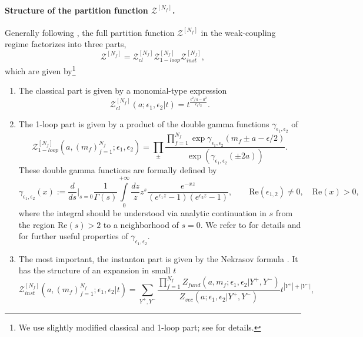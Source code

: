 \documentclass[12pt,a4paper]{article}
\numberwithin{equation}{section}
\begin{document}
\paragraph{Structure of the partition function $\mathcal{Z}^{[N_f]}$.} Generally following \cite{AGT09}, the full partition function $\mathcal{Z}^{[N_f]}$ in the weak-coupling regime factorizes into three parts, 
\begin{equation}\label{Zstr}
\mathcal{Z}^{[N_f]}=\mathcal{Z}_{cl}^{[N_f]}\mathcal{Z}_{1-loop}^{[N_f]}\mathcal{Z}_{inst}^{[N_f]},
\end{equation}
which are given by\footnote{We use slightly modified classical and 1-loop part; see \cite[Sec. 2.1]{BST25} for details.}
\begin{enumerate}
\item The classical part is given by a monomial-type expression
\begin{equation}\label{Zcl}
	\mathcal{Z}^{[N_f]}_{cl}(a;\epsilon_1,\epsilon_2|t)=t^{\frac{\epsilon^2/4-a^2}{\epsilon_1\epsilon_2}}.
\end{equation}
\item The 1-loop part is given by a product of the double gamma functions $\gamma_{\epsilon_1,\epsilon_2}$ of \cite{NY03L}
\begin{equation}
\label{Z1loop}
\mathcal{Z}^{[N_f]}_{1-loop}(a,(m_f)_{f=1}^{N_f};\epsilon_1,\epsilon_2)=\prod\limits_{\pm}\frac{\prod\limits_{f=1}^{N_f}\exp\gamma_{\epsilon_1,\epsilon_2}(m_f\pm a-\epsilon/2)}{\exp(\gamma_{\epsilon_1,\epsilon_2}(\pm 2a))}.
\end{equation}
These double gamma functions are formally defined by
\begin{equation} \label{gammaNYdef}
\gamma_{\epsilon_1,\epsilon_2}(x):=
   \frac{d}{ds}\Bigg|_{s=0}\frac1{\Gamma(s)}\int\limits_0^{+\infty}\frac{dz}{z} z^s \frac{e^{-xz}}{(e^{\epsilon_1z}-1)(e^{\epsilon_2z}-1)},\qquad \mathrm{Re}(\epsilon_{1,2})\neq0, \quad \mathrm{Re}(x)>0,
\end{equation}
where the integral should be understood via analytic continuation in $s$ from the region $\mathrm{Re}(s)>2$ to a neighborhood of $s=0$. We refer to \cite[App. B]{BST25} for details and for further useful properties of $\gamma_{\epsilon_1,\epsilon_2}$.
\item The most important, the instanton part is given by the Nekrasov formula \cite{N02,Flume:2002az,Bruzzo:2002xf}. It has the structure of an expansion in small $t$
\begin{equation}
\label{Zinst}
\mathcal{Z}^{[N_f]}_{inst}(a,(m_f)_{f=1}^{N_f};\epsilon_1,\epsilon_2|t)=\sum_{Y^+,Y^-}\frac{\prod\limits_{f=1}^{N_f} Z_{fund}(a,m_f;\epsilon_1,\epsilon_2|Y^+,Y^-)}{Z_{vec}(a;\epsilon_1,\epsilon_2|Y^+,Y^-)} t^{|Y^+|+|Y^-|},

\end{equation}
\end{enumerate}
\end{document}
